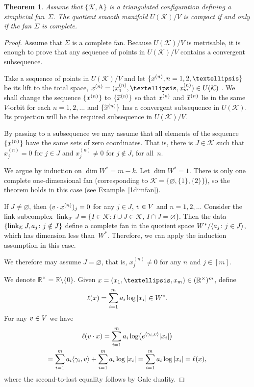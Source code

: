 \documentclass[a4paper]{amsart}
\newtheorem{theorem}{Theorem}[section]
\theoremstyle{definition}
\theoremstyle{remark}
\numberwithin{equation}{section}
\def\R{\mathbb R}
\def\R{\mathbb R}
\def\sK{\mathcal K}
\newcommand{\mb}[1]{{\textbf {\textit#1}}}
\newcommand{\<}{\langle}
\renewcommand{\>}{\rangle}
\begin{document}
\begin{theorem}\label{comcom}
Assume that $\{\mathcal K,\mathrm A\}$ is a triangulated configuration defining a simplicial fan~$\Sigma$.
The quotient smooth manifold $U(\sK)/V$ is compact if and only if the fan $\Sigma$ is complete.
\end{theorem}
\begin{proof}
Assume that $\Sigma$ is a complete fan.
Because $U(\sK)/V$ is metrisable, it is enough to prove that any sequence of points in $U(\sK)/V$ contains a convergent subsequence.

Take a sequence of points in $U(\sK)/V$ and let $\{\mb x^{(n)},n=1,2,\ldots\}$ be its lift to the total space, $\mb x^{(n)}=(x_1^{(n)} , \dots , x_m^{(n)}) \in U(\sK)$ . We shall change the sequence $\{\mb x^{(n)}\}$ to $\{\widetilde{\mb x}^{(n)}\}$ so that $\mb x^{(n)}$ and $\widetilde{\mb x}^{(n)}$ lie in the same $V$-orbit for each $n=1,2,\ldots$ and $\{\widetilde{\mb x}^{(n)}\}$ has a convergent  subsequence  in $U(\sK)$. Its projection will be the required subsequence in $U(\sK)/V$. 

By passing to a subsequence we may assume that  all elements of the sequence $\{\mb x^{(n)}\}$ have the same sets of zero coordinates. That is, there is $J\in\sK$ such that $x^{(n)}_j=0$ for $j\in J$ and $x^{(n)}_j\ne0$ for $j\notin J$, for all~$n$.

We argue by induction on $\dim W^*=m-k$. Let $\dim W^*=1$.  There is only one complete one-dimensional fan (corresponding to $\sK=\{\varnothing,\{1\},\{2\}\}$), so the theorem holds in this case (see Example~\ref{1dimfan}).

If $J\ne\varnothing$, then $(\mb v\cdot\mb x^{(n)})_j=0$ for any $j\in J$, $\mb v\in V$ and $n=1,2,\ldots$ Consider the link subcomplex $\mathop\mathrm{link}_{\sK}J=\{I\in\sK\colon I\cup J\in\sK,\,I\cap J=\varnothing\}$. Then the data 
$\{\mathop\mathrm{link}_{\sK}J,\mb a_j\colon j\notin J\}$ define a complete fan in the quotient space $W^*/\langle\mb a_j\colon j\in J\rangle$, which has dimension less than~$W^*$. Therefore, we can apply the induction assumption in this case.

We therefore may assume $J=\varnothing$, that is, $x_j^{(n)}\ne0$ for any $n$ and $j\in[m]$.

We denote $\R^\times=\R\setminus\{0\}$. Given $\mb x=(x_1,\ldots,x_m)\in(\R^\times)^m$, define 
\[
  \ell(\mb x)=\sum_{i=1}^m\mb a_i\log|x_i|\in W^*.
\]
For any $\mb v\in V$ we have
\begin{multline}\label{lconst}
\ell(\mb v\cdot\mb x)=\sum_{i=1}^m\mb a_i\log\bigl(e^{\langle\gamma_i,\mb v\rangle}|x_i|\bigr)
\\=\sum_{i=1}^m\mb a_i\langle\gamma_i,\mb v\rangle+\sum_{i=1}^m\mb a_i\log|x_i|=\sum_{i=1}^m\mb a_i\log|x_i|=\ell(\mb x),
\end{multline}
where the second-to-last equality follows by Gale duality.


\end{proof}
\end{document}
